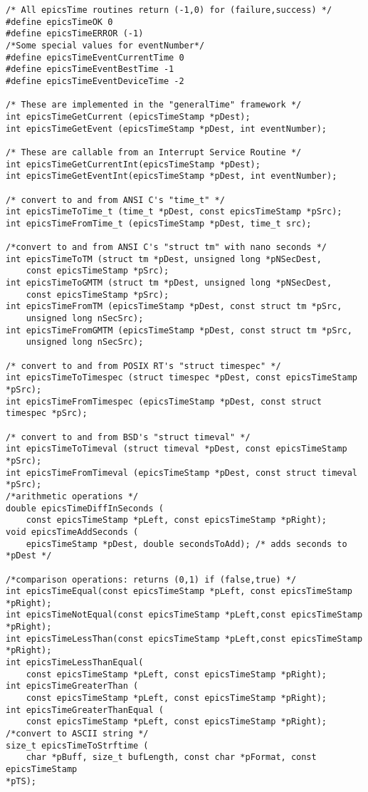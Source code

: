 \begin{verbatim}
/* All epicsTime routines return (-1,0) for (failure,success) */
#define epicsTimeOK 0
#define epicsTimeERROR (-1)
/*Some special values for eventNumber*/
#define epicsTimeEventCurrentTime 0
#define epicsTimeEventBestTime -1
#define epicsTimeEventDeviceTime -2

/* These are implemented in the "generalTime" framework */
int epicsTimeGetCurrent (epicsTimeStamp *pDest);
int epicsTimeGetEvent (epicsTimeStamp *pDest, int eventNumber);

/* These are callable from an Interrupt Service Routine */
int epicsTimeGetCurrentInt(epicsTimeStamp *pDest);
int epicsTimeGetEventInt(epicsTimeStamp *pDest, int eventNumber);

/* convert to and from ANSI C's "time_t" */
int epicsTimeToTime_t (time_t *pDest, const epicsTimeStamp *pSrc);
int epicsTimeFromTime_t (epicsTimeStamp *pDest, time_t src);

/*convert to and from ANSI C's "struct tm" with nano seconds */
int epicsTimeToTM (struct tm *pDest, unsigned long *pNSecDest,
    const epicsTimeStamp *pSrc);
int epicsTimeToGMTM (struct tm *pDest, unsigned long *pNSecDest,
    const epicsTimeStamp *pSrc);
int epicsTimeFromTM (epicsTimeStamp *pDest, const struct tm *pSrc,
    unsigned long nSecSrc);
int epicsTimeFromGMTM (epicsTimeStamp *pDest, const struct tm *pSrc,
    unsigned long nSecSrc);

/* convert to and from POSIX RT's "struct timespec" */
int epicsTimeToTimespec (struct timespec *pDest, const epicsTimeStamp *pSrc);
int epicsTimeFromTimespec (epicsTimeStamp *pDest, const struct timespec *pSrc);

/* convert to and from BSD's "struct timeval" */
int epicsTimeToTimeval (struct timeval *pDest, const epicsTimeStamp *pSrc);
int epicsTimeFromTimeval (epicsTimeStamp *pDest, const struct timeval *pSrc);
/*arithmetic operations */
double epicsTimeDiffInSeconds (
    const epicsTimeStamp *pLeft, const epicsTimeStamp *pRight);
void epicsTimeAddSeconds (
    epicsTimeStamp *pDest, double secondsToAdd); /* adds seconds to *pDest */

/*comparison operations: returns (0,1) if (false,true) */
int epicsTimeEqual(const epicsTimeStamp *pLeft, const epicsTimeStamp *pRight);
int epicsTimeNotEqual(const epicsTimeStamp *pLeft,const epicsTimeStamp *pRight);
int epicsTimeLessThan(const epicsTimeStamp *pLeft,const epicsTimeStamp *pRight);
int epicsTimeLessThanEqual(
    const epicsTimeStamp *pLeft, const epicsTimeStamp *pRight);
int epicsTimeGreaterThan (
    const epicsTimeStamp *pLeft, const epicsTimeStamp *pRight);
int epicsTimeGreaterThanEqual (
    const epicsTimeStamp *pLeft, const epicsTimeStamp *pRight);
/*convert to ASCII string */
size_t epicsTimeToStrftime (
    char *pBuff, size_t bufLength, const char *pFormat, const epicsTimeStamp 
*pTS);


\end{verbatim}
